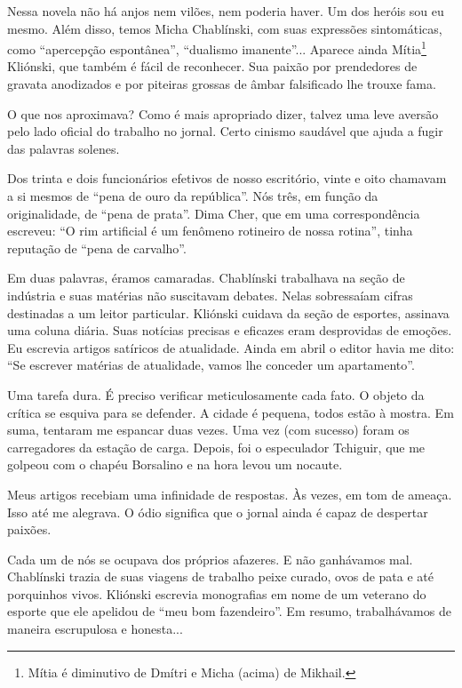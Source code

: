 Nessa novela não há anjos nem vilões, nem poderia haver. Um dos heróis
sou eu mesmo. Além disso, temos Micha Chablínski, com suas expressões
sintomáticas, como ``apercepção espontânea'', ``dualismo imanente''...
Aparece ainda Mítia\footnote{Mítia é diminutivo de Dmítri e Micha
  (acima) de Mikhail.} Kliónski, que também é fácil de reconhecer. Sua
paixão por prendedores de gravata anodizados e por piteiras grossas de
âmbar falsificado lhe trouxe fama.

O que nos aproximava? Como é mais apropriado dizer, talvez uma leve
aversão pelo lado oficial do trabalho no jornal. Certo cinismo saudável
que ajuda a fugir das palavras solenes.

Dos trinta e dois funcionários efetivos de nosso escritório, vinte e
oito chamavam a si mesmos de ``pena de ouro da república''. Nós três, em
função da originalidade, de ``pena de prata''. Dima Cher, que em uma
correspondência escreveu: ``O rim artificial é um fenômeno rotineiro de
nossa rotina'', tinha reputação de ``pena de carvalho''.

Em duas palavras, éramos camaradas. Chablínski trabalhava na seção de
indústria e suas matérias não suscitavam debates. Nelas sobressaíam
cifras destinadas a um leitor particular. Kliónski cuidava da seção de
esportes, assinava uma coluna diária. Suas notícias precisas e eficazes
eram desprovidas de emoções. Eu escrevia artigos satíricos de
atualidade. Ainda em abril o editor havia me dito: ``Se escrever
matérias de atualidade, vamos lhe conceder um apartamento''.

Uma tarefa dura. É preciso verificar meticulosamente cada fato. O objeto
da crítica se esquiva para se defender. A cidade é pequena, todos estão
à mostra. Em suma, tentaram me espancar duas vezes. Uma vez (com
sucesso) foram os carregadores da estação de carga. Depois, foi o
especulador Tchiguir, que me golpeou com o chapéu Borsalino e na hora
levou um nocaute.

Meus artigos recebiam uma infinidade de respostas. Às vezes, em tom de
ameaça. Isso até me alegrava. O ódio significa que o jornal ainda é
capaz de despertar paixões.

Cada um de nós se ocupava dos próprios afazeres. E não ganhávamos mal.
Chablínski trazia de suas viagens de trabalho peixe curado, ovos de pata
e até porquinhos vivos. Kliónski escrevia monografias em nome de um
veterano do esporte que ele apelidou de ``meu bom fazendeiro''. Em
resumo, trabalhávamos de maneira escrupulosa e honesta...

